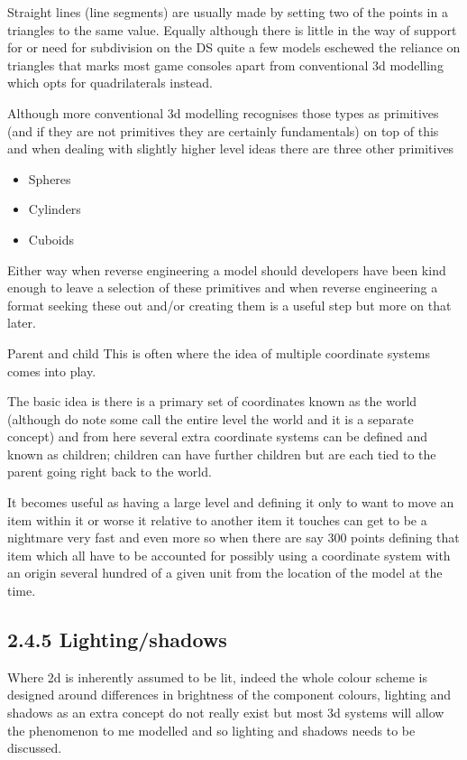 \documentclass[
]{book}
\providecommand{\tightlist}{%
  \setlength{\itemsep}{0pt}\setlength{\parskip}{0pt}}
\begin{document}
Straight lines (line segments) are usually made by setting two of the points in a triangles to the same value. Equally although there is little in the way of support for or need for subdivision on the DS quite a few models eschewed the reliance on triangles that marks most game consoles apart from conventional 3d modelling which opts for quadrilaterals instead.

Although more conventional 3d modelling recognises those types as primitives (and if they are not primitives they are certainly fundamentals) on top of this and when dealing with slightly higher level ideas there are three other primitives

\begin{itemize}
\tightlist
\item
  Spheres
\item
  Cylinders
\item
  Cuboids
\end{itemize}

Either way when reverse engineering a model should developers have been kind enough to leave a selection of these primitives and when reverse engineering a format seeking these out and/or creating them is a useful step but more on that later.

Parent and child This is often where the idea of multiple coordinate systems comes into play.

The basic idea is there is a primary set of coordinates known as the world (although do note some call the entire level the world and it is a separate concept) and from here several extra coordinate systems can be defined and known as children; children can have further children but are each tied to the parent going right back to the world.

It becomes useful as having a large level and defining it only to want to move an item within it or worse it relative to another item it touches can get to be a nightmare very fast and even more so when there are say 300 points defining that item which all have to be accounted for possibly using a coordinate system with an origin several hundred of a given unit from the location of the model at the time.

\hypertarget{lightingshadows}{%
\subsection{2.4.5 Lighting/shadows}\label{lightingshadows}}

Where 2d is inherently assumed to be lit, indeed the whole colour scheme is designed around differences in brightness of the component colours, lighting and shadows as an extra concept do not really exist but most 3d systems will allow the phenomenon to me modelled and so lighting and shadows needs to be discussed.
\end{document}
